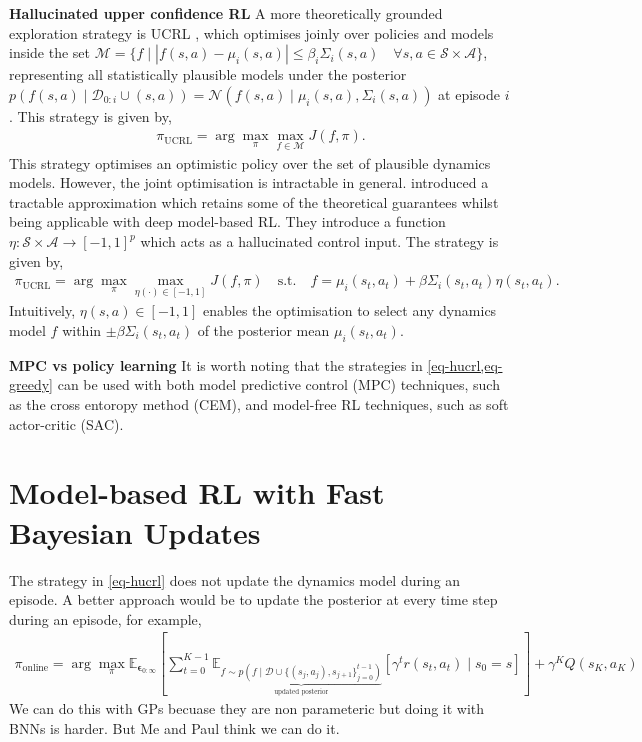 \documentclass{article}
\begin{document}
\textbf{Hallucinated upper confidence RL}
A more theoretically grounded exploration strategy is UCRL \autocite{jakschNearoptimal2010}, which optimises joinly over
policies and models inside the set
\(\mathcal{M} = \{ f \mid | f(s,a) - \mu_{i}(s, a) | \leq \beta_{i} \Sigma_{i}(s, a) \quad \forall s, a \in \mathcal{S} \times \mathcal{A} \}\), representing all statistically plausible
models under the posterior \(p(f(s,a) \mid \mathcal{D}_{0:i} \cup (s,a)) = \mathcal{N}(f(s,a) \mid \mu_{i}(s,a), \Sigma_{i}(s,a))\) at episode \(i\).
This strategy is given by,
\begin{align}
\pi_{\text{UCRL}} = \arg \max_{\pi} \max_{f \in \mathcal{M}} J(f, \pi).
\end{align}
This strategy optimises an optimistic policy over the set of plausible dynamics models.
However, the joint optimisation is intractable in general.
\cite{curiEfficient2020} introduced a tractable approximation which retains some of the theoretical guarantees whilst
being applicable with deep model-based RL.
They introduce a function \(\eta: \mathcal{S} \times \mathcal{A} \rightarrow [-1, 1]^{p}\) which acts as a hallucinated control input.
The strategy is given by,
\begin{align} \label{eq-hucrl}
\pi_{\text{UCRL}} = \arg \max_{\pi} \max_{\eta(\cdot) \in [-1,1]} J(f, \pi) \quad \text{s.t.} \quad f = \mu_{i}(s_{t}, a_{t}) + \beta \Sigma_{i}(s_{t}, a_{t}) \eta(s_{t},a_{t}).
\end{align}
Intuitively, \(\eta(s,a) \in [-1,1]\) enables the optimisation to select any dynamics model
\(f\) within \(\pm \beta \Sigma_{i}(s_{t}, a_{t})\) of the posterior mean \(\mu_{i}(s_{t}, a_{t})\).

\textbf{MPC vs policy learning}
It is worth noting that the strategies in \cref{eq-hucrl,eq-greedy} can be used with both model predictive control (MPC)
techniques, such as the cross entoropy method (CEM), and model-free RL techniques, such as soft actor-critic (SAC).


\section{Model-based RL with Fast Bayesian Updates}
The strategy in \cref{eq-hucrl} does not update the dynamics model during an episode.
A better approach would be to update the posterior at every time step during an episode, for example,
\begin{align} \label{eq-objective-with-online-updates}
\pi_{\text{online}} = \arg \max_{\pi} \mathbb{E}_{\bm\epsilon_{0:\infty}} \left[ \sum_{t=0}^{K-1}
\mathbb{E}_{\underbrace{f \sim p(f \mid \mathcal{D} \cup \{(s_{j}, a_{j}), s_{j+1}\}_{j=0}^{t-1})}_{\text{updated posterior}}} \left[ \gamma^{t} r(s_{t}, a_{t}) \mid s_{0}=s \right] \right] +
\gamma^{K} Q(s_{K},a_{K})
\end{align}
We can do this with GPs becuase they are non parameteric but doing it with BNNs is harder. But Me and Paul think we can do it.
\end{document}
